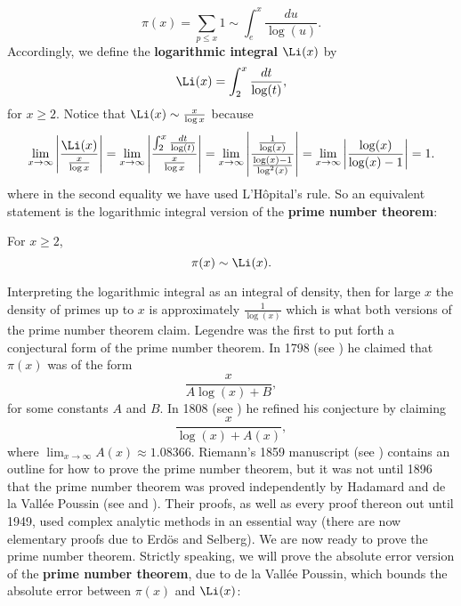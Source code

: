     \[
      \pi(x) = \sum_{p \le x}1 \sim \int_{e}^{x}\frac{du}{\log(u)}.
    \]
    Accordingly, we define the \textbf{logarithmic integral} $\Li(x)$ by
    \[
      \Li(x) = \int_{2}^{x}\frac{dt}{\log(t)},
    \]
    for $x \ge 2$. Notice that $\Li(x) \sim \frac{x}{\log{x}}$ because
    \[
      \lim_{x \to \infty}\left|\frac{\Li(x)}{\frac{x}{\log{x}}}\right| = \lim_{x \to \infty}\left|\frac{\int_{2}^{x}\frac{dt}{\log(t)}}{\frac{x}{\log{x}}}\right| = \lim_{x \to \infty}\left|\frac{\frac{1}{\log(x)}}{\frac{\log(x)-1}{\log^{2}(x)}}\right| = \lim_{x \to \infty}\left|\frac{\log(x)}{\log(x)-1}\right| = 1.
    \]
    where in the second equality we have used  L'H\^opital's rule. So an equivalent statement is the logarithmic integral version of the \textbf{prime number theorem}:

    \begin{theorem}
      For $x \ge 2$,
      \[
        \pi(x) \sim \Li(x).
      \]
    \end{theorem}

    Interpreting the logarithmic integral as an integral of density, then for large $x$ the density of primes up to $x$ is approximately $\frac{1}{\log(x)}$ which is what both versions of the prime number theorem claim. Legendre was the first to put forth a conjectural form of the prime number theorem. In 1798 (see \cite{legendre1798essai}) he claimed that $\pi(x)$ was of the form
    \[
      \frac{x}{A\log(x)+B},
    \]
    for some constants $A$ and $B$. In 1808 (see \cite{legendre1808essai}) he refined his conjecture by claiming
    \[
      \frac{x}{\log(x)+A(x)},
    \]
    where $\lim_{x \to \infty}A(x) \approx 1.08366$. Riemann's 1859 manuscript (see \cite{riemann1859ueber}) contains an outline for how to prove the prime number theorem, but it was not until 1896 that the prime number theorem was proved independently by Hadamard and de la Vall\'ee Poussin (see \cite{hadamard1896distribution} and \cite{poussin1897recherches}). Their proofs, as well as every proof thereon out until 1949, used complex analytic methods in an essential way (there are now elementary proofs due to Erd\"os and Selberg). We are now ready to prove the prime number theorem. Strictly speaking, we will prove the absolute error version of the \textbf{prime number theorem}, due to de la Vall\'ee Poussin, which bounds the absolute error between $\pi(x)$ and $\Li(x)$:

